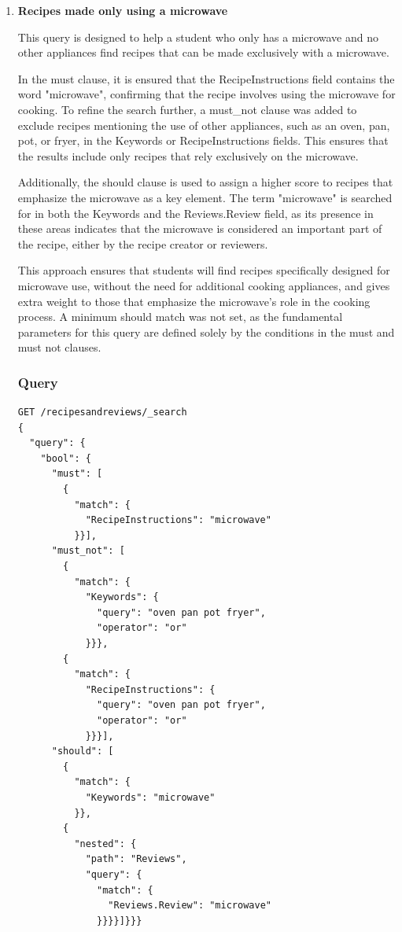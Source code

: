 \begin{enumerate}
    \item {}
          \textbf{Recipes made only using a microwave }

    This query is designed to help a student who only has a microwave and no other appliances find recipes that can be made exclusively with a microwave.
    
    In the must clause, it is ensured that the RecipeInstructions field contains the word "microwave", confirming that the recipe involves using the microwave for cooking. To refine the search further, a must\_not clause was added to exclude recipes mentioning the use of other appliances, such as an oven, pan, pot, or fryer, in the Keywords or RecipeInstructions fields. This ensures that the results include only recipes that rely exclusively on the microwave.

    Additionally, the should clause is used to assign a higher score to recipes that emphasize the microwave as a key element. The term "microwave" is searched for in both the Keywords and the Reviews.Review field, as its presence in these areas indicates that the microwave is considered an important part of the recipe, either by the recipe creator or reviewers.

    This approach ensures that students will find recipes specifically designed for microwave use, without the need for additional cooking appliances, and gives extra weight to those that emphasize the microwave's role in the cooking process. A minimum should match was not set, as the fundamental parameters for this query are defined solely by the conditions in the must and must not clauses.

    \subsubsection{Query}
    \begin{lstlisting}[language=Elasticsearch]
GET /recipesandreviews/_search
{
  "query": {
    "bool": {
      "must": [
        {
          "match": {
            "RecipeInstructions": "microwave"
          }}],
      "must_not": [
        {
          "match": {
            "Keywords": {
              "query": "oven pan pot fryer",
              "operator": "or"
            }}},
        {
          "match": {
            "RecipeInstructions": {
              "query": "oven pan pot fryer",
              "operator": "or"
            }}}],
      "should": [
        {
          "match": {
            "Keywords": "microwave"
          }},
        {
          "nested": {
            "path": "Reviews",
            "query": {
              "match": {
                "Reviews.Review": "microwave"
              }}}}]}}}
    \end{lstlisting}


\end{enumerate}
